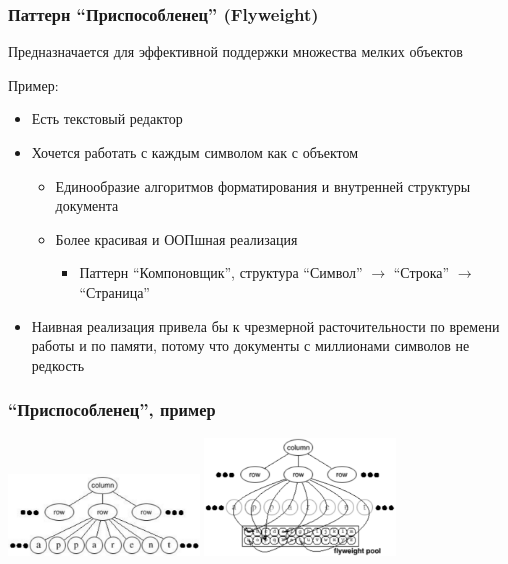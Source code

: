 \documentclass[xetex,mathserif,serif]{beamer}
\begin{document}
	\begin{frame}
		\frametitle{Паттерн ``Приспособленец'' (Flyweight)}
		Предназначается для эффективной поддержки множества мелких объектов

		Пример:

		\begin{itemize}
			\item Есть текстовый редактор
			\item Хочется работать с каждым символом как с объектом
			\begin{itemize}
				\item Единообразие алгоритмов форматирования и внутренней структуры документа
				\item Более красивая и ООПшная реализация
				\begin{itemize}
					\item Паттерн ``Компоновщик'', структура ``Символ'' $\rightarrow$ ``Строка'' $\rightarrow$ ``Страница''
				\end{itemize}
			\end{itemize}
			\item Наивная реализация привела бы к чрезмерной расточительности по времени работы и по памяти, потому что документы с миллионами символов не редкость
		\end{itemize}
	\end{frame}

	\begin{frame}
		\frametitle{``Приспособленец'', пример}
		\begin{center}
			\includegraphics[width=0.38\textwidth]{noFlyweight.png}
			\raisebox{0.1\textheight}{\quad\Huge{$\rightarrow$}\quad}
			\includegraphics[width=0.38\textwidth]{flyweightExample.png}
		\end{center}
	\end{frame}
\end{document}
